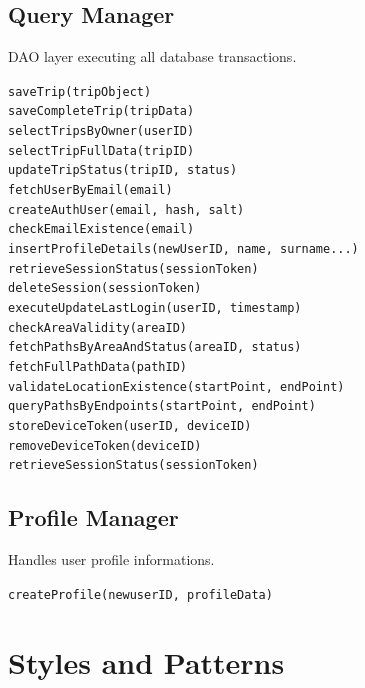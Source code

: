 \subsection{Query Manager}
DAO layer executing all database transactions.

        \texttt{saveTrip(tripObject)}\\
        \texttt{saveCompleteTrip(tripData)}\\
        \texttt{selectTripsByOwner(userID)}\\
        \texttt{selectTripFullData(tripID)}\\
        \texttt{updateTripStatus(tripID, status)}\\
        \texttt{fetchUserByEmail(email)}\\
        \texttt{createAuthUser(email, hash, salt)}\\
        \texttt{checkEmailExistence(email)}\\
        \texttt{insertProfileDetails(newUserID, name, surname...)}\\
        \texttt{retrieveSessionStatus(sessionToken)}\\
        \texttt{deleteSession(sessionToken)}\\
        \texttt{executeUpdateLastLogin(userID, timestamp)}\\
        \texttt{checkAreaValidity(areaID)}\\
        \texttt{fetchPathsByAreaAndStatus(areaID, status)}\\
        \texttt{fetchFullPathData(pathID)}\\
        \texttt{validateLocationExistence(startPoint, endPoint)}\\
        \texttt{queryPathsByEndpoints(startPoint, endPoint)}\\
        \texttt{storeDeviceToken(userID, deviceID)}\\
        \texttt{removeDeviceToken(deviceID)}\\
        \texttt{retrieveSessionStatus(sessionToken)}

\subsection{Profile Manager}
Handles user profile informations.

        \texttt{createProfile(newuserID, profileData)}






\section{Styles and Patterns}
\label{sec:three-tier}

